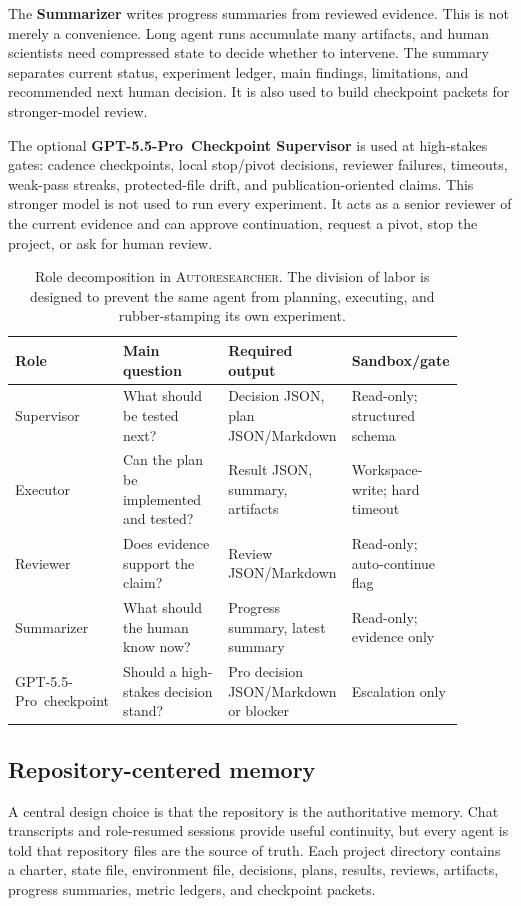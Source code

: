 \documentclass{article}
\newcommand{\sys}{\textsc{Autoresearcher}}
\newcommand{\gptpro}{GPT-5.5-Pro}
\begin{document}
The \textbf{Summarizer} writes progress summaries from reviewed evidence. This is not merely a convenience. Long agent runs accumulate many artifacts, and human scientists need compressed state to decide whether to intervene. The summary separates current status, experiment ledger, main findings, limitations, and recommended next human decision. It is also used to build checkpoint packets for stronger-model review.

The optional \textbf{\gptpro\ Checkpoint Supervisor} is used at high-stakes gates: cadence checkpoints, local stop/pivot decisions, reviewer failures, timeouts, weak-pass streaks, protected-file drift, and publication-oriented claims. This stronger model is not used to run every experiment. It acts as a senior reviewer of the current evidence and can approve continuation, request a pivot, stop the project, or ask for human review.

\begin{table}[t]
\centering
\small
\begin{tabular}{p{0.17\linewidth}p{0.29\linewidth}p{0.29\linewidth}p{0.14\linewidth}}
\toprule
Role & Main question & Required output & Sandbox/gate \\
\midrule
Supervisor & What should be tested next? & Decision JSON, plan JSON/Markdown & Read-only; structured schema \\
Executor & Can the plan be implemented and tested? & Result JSON, summary, artifacts & Workspace-write; hard timeout \\
Reviewer & Does evidence support the claim? & Review JSON/Markdown & Read-only; auto-continue flag \\
Summarizer & What should the human know now? & Progress summary, latest summary & Read-only; evidence only \\
\gptpro\ checkpoint & Should a high-stakes decision stand? & Pro decision JSON/Markdown or blocker & Escalation only \\
\bottomrule
\end{tabular}
\caption{Role decomposition in \sys. The division of labor is designed to prevent the same agent from planning, executing, and rubber-stamping its own experiment.}
\label{tab:roles}
\end{table}

\subsection{Repository-centered memory}

A central design choice is that the repository is the authoritative memory. Chat transcripts and role-resumed sessions provide useful continuity, but every agent is told that repository files are the source of truth. Each project directory contains a charter, state file, environment file, decisions, plans, results, reviews, artifacts, progress summaries, metric ledgers, and checkpoint packets.
\end{document}
